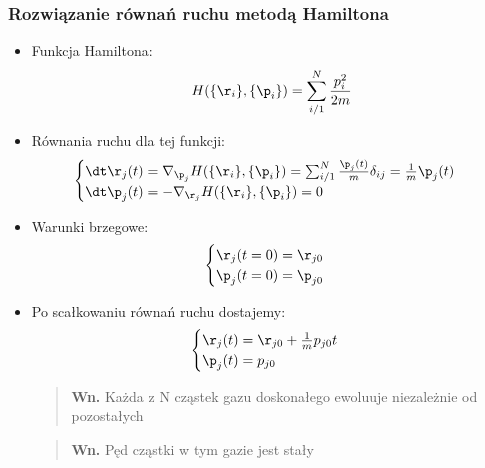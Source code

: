 \subsubsection{Rozwiązanie równań ruchu metodą Hamiltona}
\begin{itemize}
\item Funkcja Hamiltona:
\begin{equation}H(\{\r_i\},\{\p_i\})=\sum_{i/1}^{N}\frac{p_i^2}{2m}\end{equation}
\item Równania ruchu dla tej funkcji:
\begin{equation}\begin{cases} \dt \r_j(t)=\nabla_{\p_j} H(\{\r_i\},\{\p_i\})=\sum_{i/1}^{N}\frac{\p_j(t)}{m}\delta_{ij}=\frac{1}{m}\p_j(t)\\ \dt\p_j(t)=-\nabla_{\r_j} H(\{\r_i\},\{\p_i\})=0\end{cases}\end{equation} 
\item Warunki brzegowe:
\begin{equation}\begin{cases} \r_j(t=0)=\r_{j0} \\ \p_j(t=0)=\p_{j0}\end{cases}\end{equation}
\item Po scałkowaniu równań ruchu dostajemy:
\begin{equation}\begin{cases} \r_j(t)=\r_{j0}+\frac{1}{m}p_{j0}t\\ \p_j(t)=p_{j0}\end{cases} \label{RRuchu}\end{equation}
\begin{verse}\textbf{Wn.} Każda z N cząstek gazu doskonałego ewoluuje niezależnie od pozostałych\end{verse}
\begin{verse}\textbf{Wn.} Pęd cząstki w tym gazie jest stały \end{verse}
\end{itemize}
